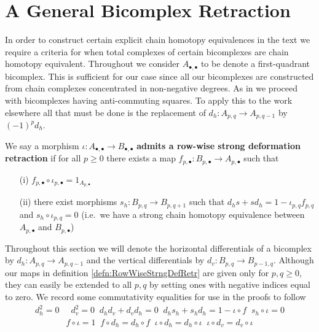 \section{A General Bicomplex Retraction}

In order to construct certain explicit chain homotopy equivalences in the text we require a criteria for when total complexes of certain bicomplexes are chain homotopy equivalent. Throughout we consider $A_{\bullet,\bullet}$ to be denote a first-quadrant bicomplex. This is sufficient for our case since all our bicomplexes are constructed from chain complexes concentrated in non-negative degrees. As in \cite{BJORT} we proceed with bicomplexes having anti-commuting squares. To apply this to the work elsewhere all that must be done is the replacement of $d_h:A_{p,q}\to A_{p,q-1}$ by $(-1)^pd_h$.

\begin{defn}[label=defn:RowWiseStrngDefRetr]
    We say a morphism $\iota:A_{\bullet,\bullet}\to B_{\bullet,\bullet}$ \textbf{admits a row-wise strong deformation retraction} if for all $p \geq 0$ there exists a map $f_{p,\bullet}:B_{p,\bullet}\to A_{p,\bullet}$ such that
    \begin{itemize}
        \item[(i)] $f_{p,\bullet}\circ \iota_{p,\bullet} = 1_{A_{p,\bullet}}$
        \item[(ii)] there exist morphisms $s_h:B_{p,q}\to B_{p,q+1}$ such that $d_hs+sd_h = 1-\iota_{p,q}f_{p,q}$ and $s_h\circ \iota_{p,q} = 0$ (i.e.\ we have a strong chain homotopy equivalence between $A_{p,\bullet}$ and $B_{p,\bullet}$)
    \end{itemize}
\end{defn}

Throughout this section we will denote the horizontal differentials of a bicomplex by $d_h:A_{p,q}\to A_{p,q-1}$ and the vertical differentials by $d_v:B_{p,q}\to B_{p-1,q}$. Although our maps in definition \ref{defn:RowWiseStrngDefRetr} are given only for $p,q\geq 0$, they can easily be extended to all $p,q$ by setting ones with negative indices equal to zero. We record some commutativity equalities for use in the proofs to follow
\begin{align*}
    d_h^2 = 0 &\;\; d_v^2=0 \;\; d_hd_v+d_vd_h = 0\;\; d_hs_h+s_hd_h=1-\iota \circ f\;\; s_h\circ \iota = 0 \\
    & f\circ \iota = 1\;\; f \circ d_h= d_h\circ f\;\; \iota \circ d_h= d_h\circ \iota \;\; \iota \circ d_v = d_v\circ \iota 
\end{align*}

